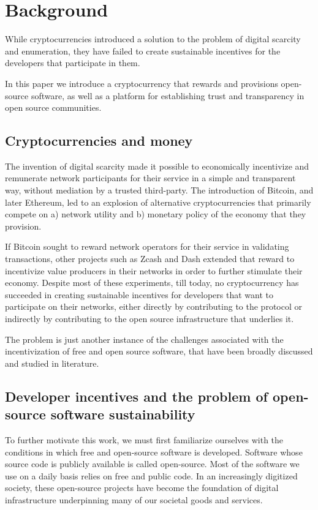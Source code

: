 \section{Background}

While cryptocurrencies introduced a solution to the problem of digital scarcity
and enumeration, they have failed to create sustainable incentives for the
developers that participate in them.

In this paper we introduce a cryptocurrency that rewards and provisions
open-source software, as well as a platform for establishing trust and
transparency in open source communities.

\subsection{Cryptocurrencies and money}

The invention of digital scarcity made it possible to economically incentivize
and remunerate network participants for their service in a simple and transparent
way, without mediation by a trusted third-party. The introduction of Bitcoin,
and later Ethereum, led to an explosion of alternative cryptocurrencies that
primarily compete on a) network utility and b) monetary policy of the economy
that they provision.

If Bitcoin sought to reward network operators for their service in validating
transactions, other projects such as Zcash and Dash extended that reward to
incentivize value producers in their networks in order to further stimulate
their economy. Despite most of these experiments, till today, no cryptocurrency
has succeeded in creating sustainable incentives for developers that want to
participate on their networks, either directly by contributing to the protocol
or indirectly by contributing to the open source infrastructure that underlies
it.

The problem is just another instance of the challenges associated with the
incentivization of free and open source software, that have been broadly
discussed and studied in literature.

\subsection{Developer incentives and the problem of open-source software
sustainability}

To further motivate this work, we must first familiarize ourselves with the
conditions in which free and open-source software is developed. Software whose
source code is publicly available is called open-source. Most of the software
we use on a daily basis relies on free and public code. In an increasingly
digitized society, these open-source projects have become the foundation of
digital infrastructure underpinning many of our societal goods and services.

